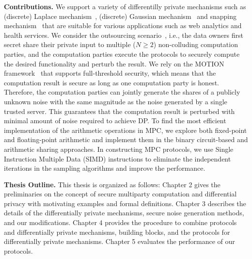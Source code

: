 \textbf{Contributions.}
We support a variety of differentilly private mechanisms such as (discrete) Laplace mechanism~\cite{chan2012privacy,ghosh2012universally,dwork2014algorithmic}, (discrete) Gaussian mechanism~\cite{dwork2014algorithmic, canonne2020discrete} and snapping mechanism~\cite{mironov2012significance} that are suitable for various applications such as web analytics and health services.
We consider the outsourcing scenario~\cite{kamara2011secure}, i.e., the data owners first secret share their private input to multiple ($N \geq 2$) non-colluding computation parties, and the computation parties execute the \smpc protocols to securely compute the desired functionality and perturb the result. We rely on the MOTION framework~\cite{braun2022motion} that supports full-threshold security, which means that the computation result is secure as long as one computation party is honest. Therefore, the computation parties can jointly generate the shares of a publicly unknown noise with the same magnitude as the noise generated by a single trusted server.
This guarantees that the computation result is perturbed with minimal amount of noise required to achieve DP.
To find the most efficient implementation of the arithmetic operations in MPC, we explore both fixed-point and floating-point arithmetic and implement them in the binary circuit-based and arithmetic sharing approaches.
In constructing MPC protocols, we use Single Instruction Multiple Data (SIMD) instructions to eliminate the independent iterations in the sampling algorithms and improve the performance.


\textbf{Thesis Outline.}
This thesis is organized as follows:
Chapter 2 gives the preliminaries on the concept of secure multiparty computation and differential privacy with motivating examples and formal definitions.
Chapter 3 describes the details of the differentially private mechanisms, secure noise generation methods, and our modifications.
Chapter 4 provides the procedure to combine \smpc protocols and differentially private mechanisms, \smpc building blocks, and the \smpc protocols for differentially private mechanisms.
Chapter 5 evaluates the performance of our \smpc protocols.

